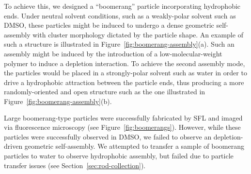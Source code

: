 To achieve this, we designed a ``boomerang'' particle incorporating 
hydrophobic ends.  Under neutral solvent conditions, such as a weakly-polar solvent such as DMSO, these particles
might be induced to undergo a 
dense geometric self-assembly with cluster morphology dictated by the 
particle shape. An example of such a structure is illustrated in Figure~\ref{fig:boomerang-assembly}(a).
Such an assembly might be induced by the introduction of a low-molecular-weight polymer to induce a 
depletion interaction.  To achieve the second assembly mode, the particles would be 
placed in a strongly-polar solvent such as water in order to drive a hydrophobic attraction between 
the particle ends, thus producing a more randomly-oriented and open structure such as the one illustrated
in Figure~\ref{fig:boomerang-assembly}(b).


Large boomerang-type particles were successfully fabricated by SFL and imaged via fluorescence 
microscopy (see Figure~\ref{fig:boomerangs}).  However, while these particles were successfully 
observed in DMSO, we failed to observe an depletion-driven geometric
self-assembly. We attempted to transfer a sample of boomerang particles to water to observe
hydrophobic assembly, but failed due to particle transfer issues (see Section~\ref{sec:rod-collection}).
